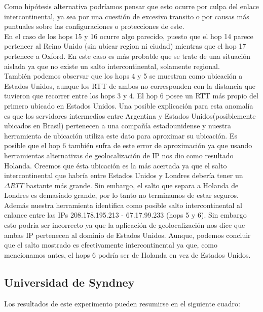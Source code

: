 Como hipótesis alternativa podríamos pensar que esto ocurre por culpa del enlace intercontinental, ya sea por una cuestión de excesivo transito o por causas más puntuales sobre las configuraciones o protecciones de este.\\

En el caso de los hops 15 y 16 ocurre algo parecido, puesto que el hop 14 parece pertencer al Reino Unido (sin ubicar region
ni ciudad) mientras que el hop 17 pertenece a Oxford. En este caso es más probable que se trate de una situación aislada
ya que no existe un salto intercontinental, solamente regional.\\

También podemos observar que los hops 4 y 5 se muestran como ubicación a Estados Unidos, aunque los RTT de ambos no corresponden con la distancia que tuvieron que recorrer entre los hops 3 y 4. El hop 6
posee un RTT más propio del primero ubicado en Estados Unidos. Una posible explicación para esta anomalía es que
los servidores intermedios entre Argentina y Estados Unidos(posiblemente ubicados en Brasil) pertenecen a una
compañía estadounidense y nuestra herramienta de ubicación utiliza este dato para aproximar su ubicación. Es posible
que el hop 6 también sufra de este error de aproximación ya que usando herramientas alternativas de geolocalización de IP nos dio
como resultado Holanda.
Creemos que ésta ubicación es la más acertada ya que el salto intercontinental que habría entre
Estados Unidos y Londres debería tener un $\Delta RTT$ bastante más grande. Sin embargo, el salto que separa a Holanda de
Londres es demasiado grande, por lo tanto no terminamos de estar seguros.\\

Además nuestra herramienta identifica como posible salto intercontinental al enlance entre las IPs 208.178.195.213 - 67.17.99.233 (hops 5 y 6).
Sin embargo esto podría ser incorrecto ya que la aplicación de geolocalización nos dice que ambas IP pertenecen al dominio de Estados Unidos. Aunque, podemos concluir que el salto mostrado es efectivamente intercontinental ya que, como mencionamos antes, el hops 6 podría ser de Holanda en vez de Estados Unidos.

\newpage

\subsection{Universidad de Syndney}

Los resultados de este experimento pueden resumirse en el siguiente cuadro:

